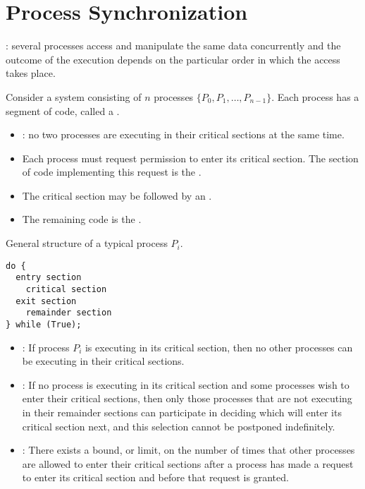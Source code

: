 \chapter{Process Synchronization}

  \par {}: several processes access and manipulate the same data concurrently and the outcome of the execution depends on the particular order in which the access takes place.

  \par Consider a system consisting of $n$ processes $\{P_0, P_1, \ldots, P_{n-1}\}$. Each process has a segment of code, called a .
  \begin{itemize}
    \item {}: no two processes are executing in their critical sections at the same time.
    \item Each process must request permission to enter its critical section. The section of code implementing this request is the .
    \item The critical section may be followed by an . 
    \item The remaining code is the .
  \end{itemize}

  \par General structure of a typical process $P_i$.
\begin{lstlisting}
do {
  entry section
    critical section
  exit section
    remainder section
} while (True);
\end{lstlisting}

    \begin{itemize}
      \item {}: If process $P_i$ is executing in its critical section, then no other processes can be executing in their critical sections.
      \item {}:  If no process is executing in its critical section and some processes wish to enter their critical sections, then only those processes that are not executing in their remainder sections can participate in deciding which will enter its critical section next, and this selection cannot be postponed indefinitely.
      \item {}: There exists a bound, or limit, on the number of times that other processes are allowed to enter their critical sections after a process has made a request to enter its critical section and before that request is granted.
    \end{itemize}

